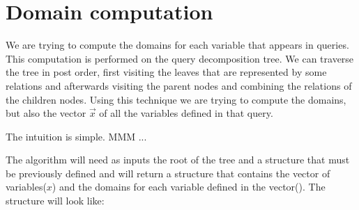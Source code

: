 \documentclass[12pt]{article}
\begin{document}
\section{Domain computation}

We are trying to compute the domains for each variable that appears in queries. This computation is performed on the query decomposition tree. We can traverse the tree in post order, first visiting the leaves that are represented by some relations and afterwards visiting the parent nodes and combining the relations of the children nodes. Using this technique we are trying to compute the domains, but also the vector $\vec x$ of all the variables defined in that query.\\
\par
The intuition is simple. MMM ...

The algorithm will need as inputs the root of the tree and a structure that must be previously defined and will return a structure that contains the vector of variables($x$) and the domains for each variable defined in the vector(\dom). The structure will look like:
\end{document}
